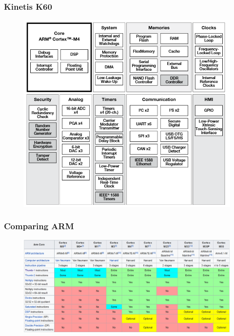 \documentclass[10.5pt,scale=1.0,t,aspectratio=169,hyperref={pdfpagelabels=false}]{beamer}
\begin{document}
\begin{frame}
	\frametitle{Kinetis K60}
		\begin{figure}
			\centering
			\includegraphics[scale=0.6]{KinetisK60}
		\end{figure}
\end{frame}
\begin{frame}
	\frametitle{Comparing ARM}
	\begin{figure}
		\centering
		\includegraphics[scale=0.3]{ComparingARM}
	\end{figure}
\end{frame}
\end{document}
